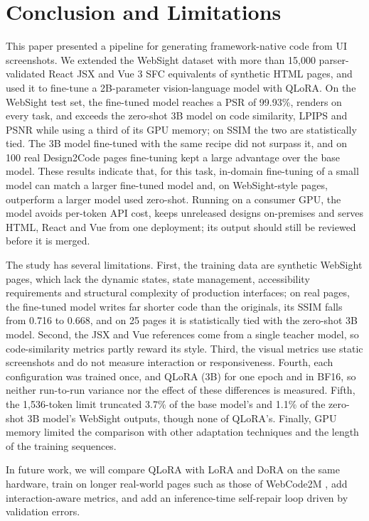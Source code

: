 \documentclass[conference,a4paper]{IEEEtran}
\begin{document}
\section{Conclusion and Limitations}

This paper presented a pipeline for generating framework-native code from UI
screenshots. We extended the WebSight dataset with more than 15,000
parser-validated React JSX and Vue 3 SFC equivalents of synthetic HTML pages, and
used it to fine-tune a 2B-parameter vision-language model with QLoRA. On the
WebSight test set, the fine-tuned model reaches a PSR of 99.93\%, renders on
every task, and exceeds the zero-shot 3B model on code similarity, LPIPS and
PSNR while using a third of its GPU memory; on SSIM the two are statistically tied. The 3B model fine-tuned with the
same recipe did not surpass it, and on 100 real Design2Code pages fine-tuning
kept a large advantage over the base model. These results indicate that, for
this task, in-domain fine-tuning of a small model can match a larger fine-tuned
model and, on WebSight-style pages, outperform a larger model used zero-shot.
Running on a consumer GPU, the model avoids per-token API cost, keeps unreleased
designs on-premises and serves HTML, React and Vue from one deployment; its
output should still be reviewed before it is merged.

The study has several limitations. First, the training data are synthetic
WebSight pages, which lack the dynamic states, state management, accessibility
requirements and structural complexity of production interfaces; on real pages,
the fine-tuned model writes far shorter code than the originals, its SSIM
falls from 0.716 to 0.668, and on 25 pages it is statistically tied with the
zero-shot 3B model. Second, the JSX and Vue references come from a
single teacher model, so code-similarity metrics partly reward its style. Third,
the visual metrics use static screenshots and do not measure interaction or
responsiveness. Fourth, each configuration was trained once, and QLoRA (3B)
for one epoch and in BF16, so neither run-to-run variance nor the effect of
these differences is measured. Fifth, the
1,536-token limit truncated 3.7\% of the base model's and 1.1\% of the zero-shot
3B model's WebSight outputs, though none of QLoRA's. Finally, GPU memory limited
the comparison with other adaptation techniques and the length of the training
sequences.

In future work, we will compare QLoRA with LoRA and DoRA \cite{liu2024dora} on
the same hardware, train on longer real-world pages such as those of WebCode2M
\cite{gui2025webcode2m}, add interaction-aware metrics, and add an
inference-time self-repair loop driven by validation errors.
\end{document}
